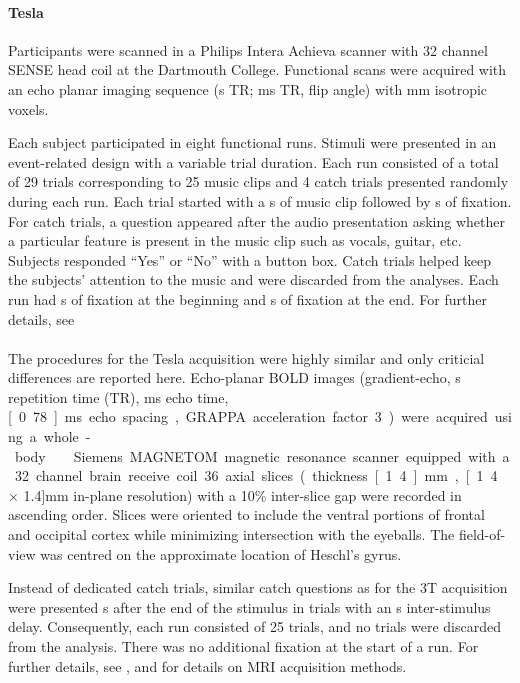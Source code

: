 \paragraph{\unit[3]{Tesla}}
%
Participants were scanned in a Philips Intera Achieva scanner with 32 channel
SENSE head coil at the Dartmouth College. Functional scans were acquired with
an echo planar imaging sequence (\unit[2]{s} TR; \unit[35]{ms} TR,
\unit[90]{\textdegree} flip angle) with \unit[3]{mm} isotropic voxels.

Each subject participated in eight functional runs. Stimuli were presented in
an event-related design with a variable trial duration. Each run consisted of a
total of 29 trials corresponding to 25 music clips and 4 catch trials presented
randomly during each run. Each trial started with a \unit[6]{s} of music clip
followed by \unit[4-8]{s} of fixation. For catch trials, a question appeared
after the audio presentation asking whether a particular feature is present in
the music clip such as vocals, guitar, etc. Subjects responded “Yes” or “No”
with a button box. Catch trials helped keep the subjects’ attention to the
music and were discarded from the analyses. Each run had \unit[4]{s} of
fixation at the beginning and \unit[10]{s} of fixation at the end. For further
details, see \citet{CTK+2012}

\paragraph{\sevenT}
%
The procedures for the \unit[7]{Tesla} acquisition were highly similar and only
criticial differences are reported here. Echo-planar BOLD images
(gradient-echo, \unit[2]{s} repetition time (TR), \unit[22]{ms} echo time,
\unit[0.78]{ms} echo spacing, GRAPPA acceleration factor 3) were acquired using
a whole-body \sevenT\ Siemens MAGNETOM magnetic resonance scanner equipped with
a 32 channel brain receive coil. 36 axial slices (thickness \unit[1.4]{mm},
\unit[1.4 $\times$ 1.4]{mm} in-plane resolution) with a 10\% inter-slice gap
were recorded in ascending order.  Slices were oriented to include the ventral
portions of frontal and occipital cortex while minimizing intersection with the
eyeballs. The field-of-view was centred on the approximate location of Heschl's
gyrus.

Instead of dedicated catch trials, similar catch questions as for the 3T
acquisition were presented \unit[4]{s} after the end of the stimulus in trials
with an \unit[8]{s} inter-stimulus delay. Consequently, each run consisted of
25 trials, and no trials were discarded from the analysis.  There was no
additional fixation at the start of a run. For further details, see
\citet{HDH+2015}, and \citet{HBI+14} for details on MRI acquisition methods.


